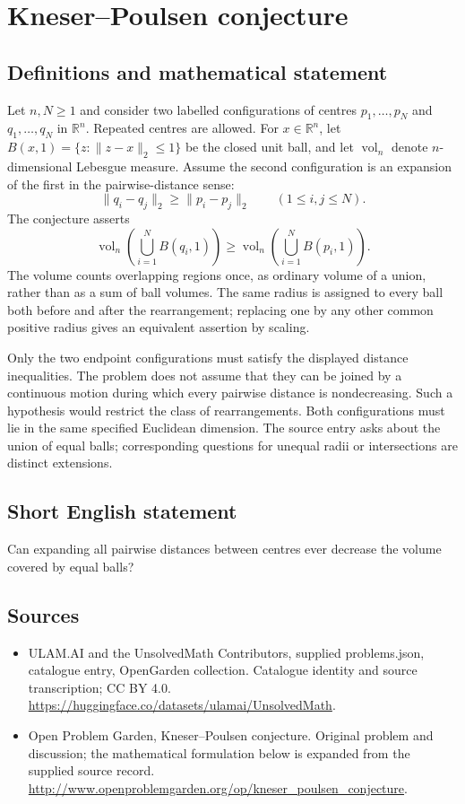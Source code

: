 \documentclass[11pt,a4paper]{article}
\begin{document}
\section*{Kneser–Poulsen conjecture}\label{statement}

\subsection{Definitions and mathematical statement}
Let $n,N\ge1$ and consider two labelled configurations of centres
$p_1,\ldots,p_N$ and $q_1,\ldots,q_N$ in $\mathbb R^n$.
Repeated centres are allowed. For $x\in\mathbb R^n$, let
$B(x,1)=\{z:\|z-x\|_2\le1\}$ be the closed unit ball, and let
$\operatorname{vol}_n$ denote $n$-dimensional Lebesgue measure.
Assume the second configuration is an expansion of the first in the
pairwise-distance sense:
\[
 \|q_i-q_j\|_2\ge\|p_i-p_j\|_2
                    \qquad(1\le i,j\le N).
\]
The conjecture asserts
\[
 \operatorname{vol}_n\!\left(\bigcup_{i=1}^N B(q_i,1)\right)
 \ge
 \operatorname{vol}_n\!\left(\bigcup_{i=1}^N B(p_i,1)\right).
\]
The volume counts overlapping regions once, as ordinary volume of a
union, rather than as a sum of ball volumes. The same radius is assigned
to every ball both before and after the rearrangement; replacing one by
any other common positive radius gives an equivalent assertion by scaling.

Only the two endpoint configurations must satisfy the displayed distance
inequalities. The problem does not assume that they can be joined by a
continuous motion during which every pairwise distance is nondecreasing.
Such a hypothesis would restrict the class of rearrangements. Both
configurations must lie in the same specified Euclidean dimension.
The source entry asks about the union of equal balls; corresponding
questions for unequal radii or intersections are distinct extensions.
\subsection{Short English statement}
Can expanding all pairwise distances between centres ever decrease the volume covered by equal balls?
\subsection{Sources}
\begin{itemize}
\item[S1] ULAM.AI and the UnsolvedMath Contributors, supplied problems.json, catalogue entry, OpenGarden collection. Catalogue identity and source transcription; CC BY 4.0.
\url{https://huggingface.co/datasets/ulamai/UnsolvedMath}.
\item[S2] Open Problem Garden, Kneser–Poulsen conjecture. Original problem and discussion; the mathematical formulation below is expanded from the supplied source record.
\url{http://www.openproblemgarden.org/op/kneser_poulsen_conjecture}.
\end{itemize}
\end{document}
